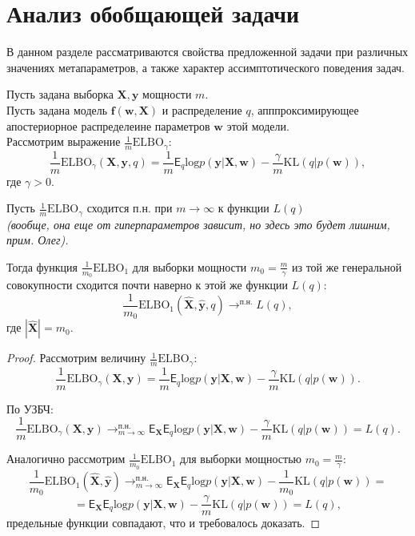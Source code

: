 \section{Анализ обобщающей задачи}
В данном разделе рассматриваются свойства предложенной задачи при различных значениях метапараметров, а также характер ассимптотического поведения задач.

\begin{theorem}
Пусть задана выборка $\mathbf{X}, \mathbf{y}$ мощности $m$.\\
Пусть задана модель $\mathbf{f}(\mathbf{w}, \mathbf{X})$ и распределение $q$, апппроксимирующее апостериорное распределеине параметров $\mathbf{w}$ этой модели.\\
Рассмотрим выражение $\frac{1}{m} \text{ELBO}_{\gamma}$:\\
\[
    \frac{1}{m}\text{ELBO}_{\gamma}(\mathbf{X}, \mathbf{y}, q)= \frac{1}{m}\mathsf{E}_q \text{log}p(\mathbf{y}|\mathbf{X}, \mathbf{w}) - \frac{\gamma}{m}\text{KL}(q|p(\mathbf{w})),
\]
где $\gamma > 0$.

Пусть $\frac{1}{m} \text{ELBO}_{\gamma}$ сходится п.н. при $m \to \infty$ к функции $L(q)$\\ \textit{(вообще, она еще от гиперпараметров зависит, но здесь это будет лишним, прим. Олег).}

Тогда функция $\frac{1}{m_0} \text{ELBO}_{1}$ для  выборки мощности $m_0 = \frac{m}{\gamma}$ из той же генеральной совокупности сходится почти наверно к этой же функции $L(q)$:
\[
    \frac{1}{m_0} \text{ELBO}_{1}(\hat{\mathbf{X}}, \hat{\mathbf{y}}, q) \to^{\text{п.н.}} L(q),
\]
где $|\hat{\mathbf{X}}| = m_0$.
\end{theorem}
\begin{proof}
Рассмотрим величину  $\frac{1}{m}\text{ELBO}_{\gamma}$: \\
\[
    \frac{1}{m}\text{ELBO}_{\gamma}(\mathbf{X}, \mathbf{y})= \frac{1}{m}\mathsf{E}_q \text{log}p(\mathbf{y}|\mathbf{X}, \mathbf{w}) - \frac{\gamma}{m}\text{KL}(q|p(\mathbf{w})).
\]

По УЗБЧ: 
\[
    \frac{1}{m}\text{ELBO}_{\gamma}(\mathbf{X}, \mathbf{y}) \to_{m \to \infty}^{\text{п.н.}} \mathsf{E}_\mathbf{X}\mathsf{E}_{q} \text{log}p(\mathbf{y}|\mathbf{X}, \mathbf{w}) - \frac{\gamma}{m}\text{KL}(q|p(\mathbf{w})) = L(q).
\]

Аналогично рассмотрим $\frac{1}{m_0}\text{ELBO}_{1}$ для выборки мощностью $m_0 = \frac{m}{\gamma}$:
\[
    \frac{1}{m_0}\text{ELBO}_{1}(\hat{\mathbf{X}}, \hat{\mathbf{y}}) \to_{m \to \infty}^{\text{п.н.}} \mathsf{E}_\mathbf{X}\mathsf{E}_{q} \text{log}p(\mathbf{y}|\mathbf{X}, \mathbf{w}) - \frac{1}{m_0}\text{KL}(q|p(\mathbf{w})) = 
\]
\[
=  \mathsf{E}_\mathbf{X}\mathsf{E}_{q} \text{log}p(\mathbf{y}|\mathbf{X}, \mathbf{w}) - \frac{\gamma}{m}\text{KL}(q|p(\mathbf{w})) = L(q),
\]
предельные функции совпадают, что и требовалось доказать.
\end{proof}
